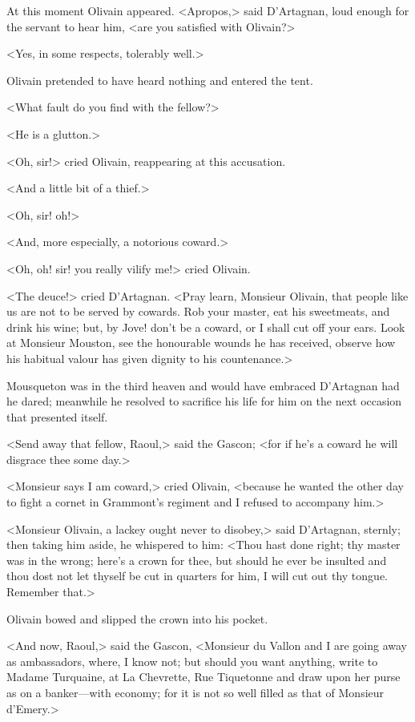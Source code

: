 At this moment Olivain appeared. <Apropos,> said D'Artagnan, loud enough for the servant to hear him, <are you satisfied with Olivain?>

<Yes, in some respects, tolerably well.>

Olivain pretended to have heard nothing and entered the tent.

<What fault do you find with the fellow?>

<He is a glutton.>

<Oh, sir!> cried Olivain, reappearing at this accusation.

<And a little bit of a thief.>

<Oh, sir! oh!>

<And, more especially, a notorious coward.>

<Oh, oh! sir! you really vilify me!> cried Olivain.

<The deuce!> cried D'Artagnan. <Pray learn, Monsieur Olivain, that people like us are not to be served by cowards. Rob your master, eat his sweetmeats, and drink his wine; but, by Jove! don't be a coward, or I shall cut off your ears. Look at Monsieur Mouston, see the honourable wounds he has received, observe how his habitual valour has given dignity to his countenance.>

Mousqueton was in the third heaven and would have embraced D'Artagnan had he dared; meanwhile he resolved to sacrifice his life for him on the next occasion that presented itself.

<Send away that fellow, Raoul,> said the Gascon; <for if he's a coward he will disgrace thee some day.>

<Monsieur says I am coward,> cried Olivain, <because he wanted the other day to fight a cornet in Grammont's regiment and I refused to accompany him.>

<Monsieur Olivain, a lackey ought never to disobey,> said D'Artagnan, sternly; then taking him aside, he whispered to him: <Thou hast done right; thy master was in the wrong; here's a crown for thee, but should he ever be insulted and thou dost not let thyself be cut in quarters for him, I will cut out thy tongue. Remember that.>

Olivain bowed and slipped the crown into his pocket.

<And now, Raoul,> said the Gascon, <Monsieur du Vallon and I are going away as ambassadors, where, I know not; but should you want anything, write to Madame Turquaine, at La Chevrette, Rue Tiquetonne and draw upon her purse as on a banker—with economy; for it is not so well filled as that of Monsieur d'Emery.>

